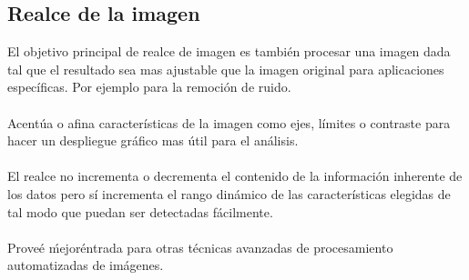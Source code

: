         \subsection{Realce de la imagen}
            El objetivo principal de realce de imagen es también procesar una imagen dada tal que el resultado sea mas ajustable que la imagen original para aplicaciones específicas. Por ejemplo para la remoción de ruido.
            \\\\%
            Acentúa o afina características de la imagen como ejes, límites o contraste para hacer un despliegue gráfico mas útil para el análisis.
            \\\\%
            El realce no incrementa o decrementa el contenido de la información inherente de los datos pero sí incrementa el rango dinámico de las características elegidas de tal modo que puedan ser detectadas fácilmente.
            \\\\%
            Proveé \'mejor\' entrada para otras técnicas avanzadas de procesamiento automatizadas de imágenes.
                        
